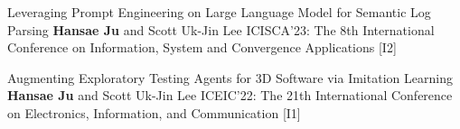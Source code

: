 \begin{cventries}
  \pbentry
  {Leveraging Prompt Engineering on Large Language Model for Semantic Log Parsing} %
  {\textbf{Hansae Ju} and Scott Uk-Jin Lee}
  {ICISCA'23: The 8th International Conference on Information, System and Convergence Applications}
  {\href{https://github.com/Verssae/Verssae/blob/3f89da13976aaa5cbd1e3bdce61926b392d6e797/assets/papers/ICISCA\%2023/Leveraging\%20Prompt\%20Engineering\%20on\%20Large\%20Language\%20Model\%20for\%20Semantic\%20Log\%20Parsing.pdf}{\paper}}
  {\href{https://github.com/Verssae/LogParsingGPT}{\githubCode}}
  {[I2]}

  \pbentry
  {Augmenting Exploratory Testing Agents for 3D Software via Imitation Learning } %
  {\textbf{Hansae Ju} and Scott Uk-Jin Lee}
  {ICEIC'22: The 21th International Conference on Electronics, Information, and Communication}
  {\href{https://github.com/Verssae/Verssae/blob/3f89da13976aaa5cbd1e3bdce61926b392d6e797/assets/papers/ICEIC\%2022/Augmenting\%20Exploratory\%20Testing\%20Agents\%20for\%203D\%20Software\%20via\%20Imitation\%20Learning.pdf}{\paper}}
  {\href{https://github.com/Verssae/testing-ml-agents}{\githubCode}}
  {[I1]}

\end{cventries}

